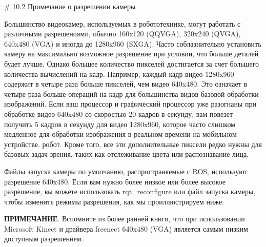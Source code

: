 # 10.2 Примечание о разрешении камеры


Большинство видеокамер, используемых в робототехнике, могут работать с различными разрешениями, обычно 160x120 (QQVGA), 320x240 (QVGA), 640x480 (VGA) и иногда до 1280x960 (SXGA). Часто соблазнительно установить камеру на максимально возможное разрешение при условии, что больше деталей будет лучше. Однако большее количество пикселей достигается за счет большего количества вычислений на кадр. Например, каждый кадр видео 1280x960 содержит в четыре раза больше пикселей, чем видео 640x480. Это означает в четыре раза больше операций на кадр для большинства видов базовой обработки изображений. Если ваш процессор и графический процессор уже разогнаны при обработке видео 640x480 со скоростью 20 кадров в секунду, вам повезет получить 5 кадров в секунду для видео 1280x960, которое часто слишком медленное для обработки изображения в реальном времени на мобильном устройстве. робот. Кроме того, все эти дополнительные пиксели редко нужны для базовых задач зрения, таких как отслеживание цвета или распознавание лица.

Файлы запуска камеры по умолчанию, распространяемые с ROS, используют разрешение 640x480. Если вам нужно более низкое или более высокое разрешение, вы можете использовать rqt\_reconfigure или файл запуска камеры, чтобы изменить режимы разрешения, как мы проиллюстрируем ниже.

\textbf{ПРИМЕЧАНИЕ}. Вспомните из более ранней книги, что при использовании Microsoft Kinect и драйвера freenect 640x480 (VGA) является самым низким доступным разрешением.


